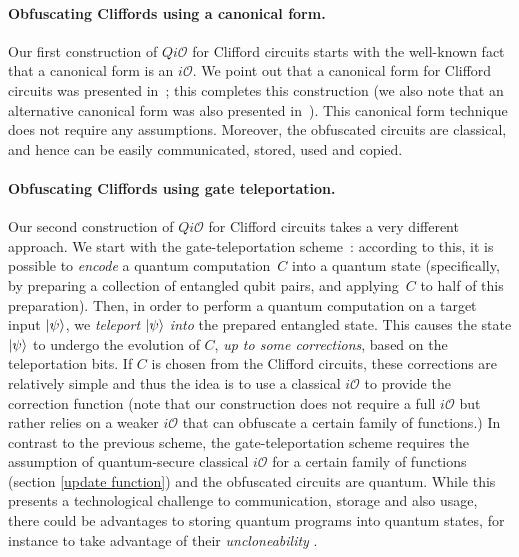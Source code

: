 \paragraph{Obfuscating Cliffords using a canonical form.} Our first construction of $Qi\mathcal{O}$ for Clifford circuits starts with the well-known fact that a canonical form is an $i\mathcal{O}$. We point out that a canonical form for Clifford circuits was presented in~\cite{AG04}; this completes this construction (we also note that an alternative canonical form was also presented in~\cite{Sel13arxiv}). This canonical form technique  does not require any assumptions. Moreover, the obfuscated circuits are classical, and hence can be easily communicated, stored, used and copied.

\paragraph{Obfuscating Cliffords using gate teleportation.} Our second construction of $Qi\mathcal{O}$ for Clifford circuits takes a very different approach. We start with the gate-teleportation scheme~\cite{GC99}: according to this, it is possible to \emph{encode} a quantum computation~$C$ into a quantum state (specifically, by preparing a collection of entangled qubit pairs, and applying~$C$ to half of this preparation). Then, in order to perform a quantum computation on a target input ${\lvert}\psi\rangle$, we \emph{teleport} ${\lvert}\psi\rangle$ \emph{into} the prepared entangled state. This causes the state ${\lvert}\psi\rangle$ to undergo the evolution of $C$, \emph{up to some corrections}, based on the teleportation bits. If $C$ is chosen from the Clifford circuits, these corrections are relatively simple and thus the idea is to use a classical  $i\mathcal{O}$ to provide the correction function (note that our construction does not require a full $i\mathcal{O}$ but rather relies on a weaker $i\mathcal{O}$ that can obfuscate a certain family of functions.)
In contrast to the previous scheme, the gate-teleportation scheme requires the assumption of quantum-secure classical $i\mathcal{O}$ for a certain family of functions (section \ref{update function}) and the obfuscated circuits are quantum. While this presents a technological challenge to communication, storage and also usage, there could be advantages to storing quantum programs into quantum states, for instance to take advantage of their \emph{uncloneability} \cite{Aar09,BL19arxiv}.



